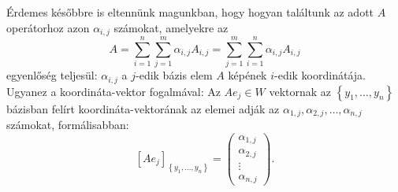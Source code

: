 \documentclass[9pt, a4paper, showtrims]{memoir}
\theoremstyle{plain}
\theoremstyle{remark}
\theoremstyle{definition}
\begin{document}
Érdemes későbbre is eltennünk magunkban,
hogy hogyan találtunk az adott $A$ operátorhoz azon $\alpha_{i,j}$ számokat,
amelyekre az
\[
	A=
	\sum_{i=1}^n\sum_{j=1}^m\alpha_{i,j}A_{i,j}
	=
	\sum_{j=1}^m\sum_{i=1}^n\alpha_{i,j}A_{i,j}
\]
egyenlőség teljesül:
$\alpha_{i,j}$ a $j$-edik bázis elem $A$ képének $i$-edik koordinátája.
Ugyanez a koordináta-vektor fogalmával:
Az $Ae_j\in W$ vektornak az $\left\{ y_1,\ldots,y_n \right\}$ bázisban felírt koordináta-vektorának az elemei
adják az $\alpha_{1,j},\alpha_{2,j},\ldots,\alpha_{n,j}$ számokat, formálisabban:
\[
	\left[ Ae_j \right]_{\left\{ y_1,\ldots,y_n \right\}}
	=
	\begin{pmatrix}
		\alpha_{1,j} \\ \alpha_{2,j}\\ \vdots \\ \alpha_{n,j}
	\end{pmatrix}.
\]
\end{document}
